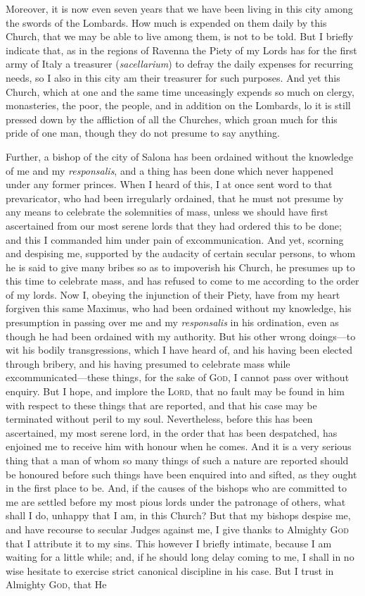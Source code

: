 Moreover, it is now even seven years that we have been living in this city among the swords of the Lombards. How much is expended on them daily by this Church, that we may be able to live among them, is not to be told. But I briefly indicate that, as in the regions of Ravenna the Piety of my Lords has for the first army of Italy a treasurer (\emph{sacellarium}) to defray the daily expenses for recurring needs, so I also in this city am their treasurer for such purposes. And yet this Church, which at one and the same time unceasingly expends so much on clergy, monasteries, the poor, the people, and in addition on the Lombards, lo it is still pressed down by the affliction of all the Churches, which groan much for this pride of one man, though they do not presume to say anything.

Further, a bishop of the city of Salona has been ordained without the knowledge of me and my \emph{responsalis}, and a thing has been done which never happened under any former princes. When I heard of this, I at once sent word to that prevaricator, who had been irregularly ordained, that he must not presume by any means to celebrate the solemnities of mass, unless we should have first ascertained from our most serene lords that they had ordered this to be done; and this I commanded him under pain of excommunication. And yet, scorning and despising me, supported by the audacity of certain secular persons, to whom he is said to give many bribes so as to impoverish his Church, he presumes up to this time to celebrate mass, and has refused to come to me according to the order of my lords. Now I, obeying the injunction of their Piety, have from my heart forgiven this same Maximus, who had been ordained without my knowledge, his presumption in passing over me and my \emph{responsalis} in his ordination, even as though he had been ordained with my authority. But his other wrong doings—to wit his bodily transgressions, which I have heard of, and his having been elected through bribery, and his having presumed to celebrate mass while excommunicated—these things, for the sake of \textsc{God}, I cannot pass over without enquiry. But I hope, and implore the \textsc{Lord}, that no fault may be found in him with respect to these things that are reported, and that his case may be terminated without peril to my soul. Nevertheless, before this has been ascertained, my most serene lord, in the order that has been despatched, has enjoined me to receive him with honour when he comes. And it is a very serious thing that a man of whom so many things of such a nature are reported should be honoured before such things have been enquired into and sifted, as they ought in the first place to be. And, if the causes of the bishops who are committed to me are settled before my most pious lords under the patronage of others, what shall I do, unhappy that I am, in this Church? But that my bishops despise me, and have recourse to secular Judges against me, I give thanks to Almighty \textsc{God} that I attribute it to my sins. This however I briefly intimate, because I am waiting for a little while; and, if he should long delay coming to me, I shall in no wise hesitate to exercise strict canonical discipline in his case. But I trust in Almighty \textsc{God}, that He 